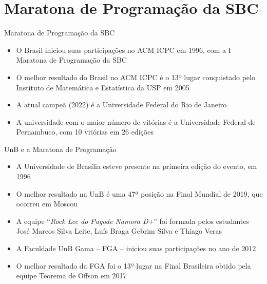 \section{Maratona de Programação da SBC}

\begin{frame}[fragile]{Maratona de Programação da SBC}

    \begin{itemize}
        \item O Brasil iniciou suas participações no ACM ICPC em 1996, com a I Maratona de
            Programação da SBC
        \item O melhor resultado do Brasil no ACM ICPC é o 13º lugar conquistado pelo 
            Instituto de Matemática e Estatística da USP em 2005
        \item A atual campeã (2022) é a Universidade Federal do Rio de Janeiro
        \item A universidade com o maior número de vitórias é a Universidade Federal de
            Pernambuco, com 10 vitórias em 26 edições
    \end{itemize}

\end{frame}

\begin{frame}[fragile]{UnB e a Maratona de Programação}

    \begin{itemize}
        \item A Universidade de Brasília esteve presente na primeira edição do evento, em 1996
        \item O melhor resultado na UnB é uma 47ª posição na Final Mundial de 2019, que ocorreu
            em Moscou

        \item A equipe ``\textit{Rock Lee do Pagode Namora D+}'' foi formada pelos estudantes José Marcos 
            Silva Leite, Luís Braga Gebrim Silva e Thiago Veras

        \item A Faculdade UnB Gama -- FGA -- iniciou suas participações no ano de 2012
        \item O melhor resultado da FGA foi o 13º lugar na Final Brasileira obtido pela equipe 
            Teorema de Offson em 2017
    \end{itemize}

\end{frame}
